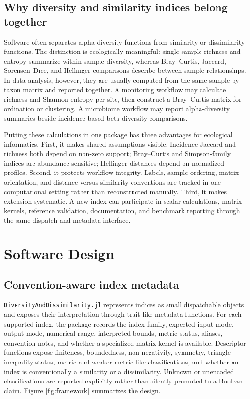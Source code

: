 \documentclass[preprint,12pt,authoryear]{elsarticle}
\begin{document}
\subsection{Why diversity and similarity indices belong together}

Software often separates alpha-diversity functions from similarity or
dissimilarity functions.  The distinction is ecologically meaningful:
single-sample richness and entropy summarize within-sample diversity, whereas
Bray--Curtis, Jaccard, Sorensen--Dice, and Hellinger comparisons describe
between-sample relationships.  In data analysis, however, they are usually
computed from the same sample-by-taxon matrix and reported together.  A
monitoring workflow may calculate richness and Shannon entropy per site, then
construct a Bray--Curtis matrix for ordination or clustering.  A microbiome
workflow may report alpha-diversity summaries beside incidence-based
beta-diversity comparisons.

Putting these calculations in one package has three advantages for ecological
informatics.  First, it makes shared assumptions visible.  Incidence Jaccard
and richness both depend on non-zero support; Bray--Curtis and Simpson-family
indices are abundance-sensitive; Hellinger distances depend on normalized
profiles.  Second, it protects workflow integrity.  Labels, sample ordering,
matrix orientation, and distance-versus-similarity conventions are tracked in
one computational setting rather than reconstructed manually.  Third, it makes
extension systematic.  A new index can participate in scalar calculations,
matrix kernels, reference validation, documentation, and benchmark reporting
through the same dispatch and metadata interface.

\section{Software Design}

\subsection{Convention-aware index metadata}

\texttt{DiversityAndDissimilarity.jl} represents indices as small dispatchable objects
and exposes their interpretation through trait-like metadata functions.
For each supported index, the package records the index family, expected input
mode, output mode, numerical range, interpreted bounds, metric status, aliases,
convention notes, and whether a specialized matrix kernel is available.
Descriptor functions expose finiteness, boundedness, non-negativity, symmetry,
triangle-inequality status, metric and weaker metric-like classifications, and
whether an index is conventionally a similarity or a dissimilarity.  Unknown
or unencoded classifications are reported explicitly rather than silently
promoted to a Boolean claim.  Figure \ref{fig:framework} summarizes the design.
\end{document}

